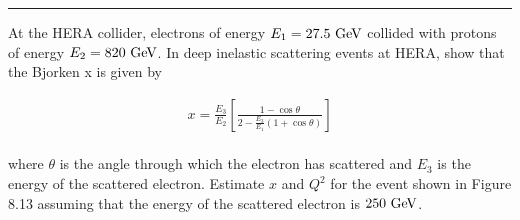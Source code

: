 \noindent\rule{7in}{1.5pt}


\begin{problem}{8.8}
At the HERA collider, electrons of energy $E_1 = 27.5 \text{ GeV}$ collided with protons of energy $E_2 = 820 \text{ GeV}$. In deep inelastic scattering events at HERA, show that the Bjorken x is given by

\begin{align*}
    x = \frac{E_3}{E_2} \left[ \frac{1-\cos\theta}{2-\frac{E_3}{E_1}\left(1+\cos\theta\right)} \right]
\end{align*}\\
where $\theta$ is the angle through which the electron has scattered and $E_3$ is the energy of the scattered electron. Estimate $x$ and $Q^2$ for the event shown in Figure 8.13 assuming that the energy of the scattered electron is $250 \text{ GeV}$.
\end{problem}
